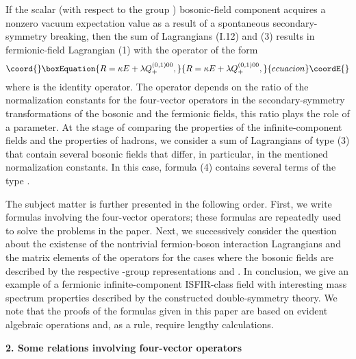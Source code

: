 \documentclass[a4paper,12pt]{article}
\begin{document}
If the scalar (with respect to the group \coordHE{}) bosonic-field 
component \coordHE{} acquires a nonzero vacuum expectation
value \myHighlight{$\lambda$}\coordHE{} as a result of a spontaneous secondary-symmetry breaking, then
the sum of Lagrangians (I.12) and (3) results in fermionic-field Lagrangian (1)
with the operator \coordHE{} of the form
\begin{equation}\coord{}\boxEquation{
R = \kappa E + \lambda Q^{(0,1)00}_{+},
}{
R = \kappa E + \lambda Q^{(0,1)00}_{+},
}{ecuacion}\coordE{}\end{equation}
where \coordHE{} is the identity operator. The operator \coordHE{} depends on
the ratio of the normalization constants for the four-vector operators 
\coordHE{} in the secondary-symmetry transformations of the bosonic and the
fermionic fields, this ratio plays the role of a parameter. At the stage of
comparing the properties of the infinite-component fields and the properties of
hadrons, we consider a sum of Lagrangians of type (3) that contain several 
bosonic fields that differ, in particular, in the mentioned normalization 
constants. In this case, formula (4) contains several terms of the type 
\coordHE{}. 

The subject matter is further presented in the following order. First, we write
formulas involving the four-vector operators; these formulas are repeatedly 
used to solve the problems in the paper. Next, we successively consider the 
question about the existense of the nontrivial fermion-boson interaction 
Lagrangians and the matrix elements of the operators \coordHE{} for 
the cases where the bosonic fields are described by the respective 
\coordHE{}-group representations \coordHE{} and \coordHE{}. In conclusion, 
we give an example of a fermionic infinite-component ISFIR-class field with
interesting mass spectrum properties described by the constructed
double-symmetry theory. We note that the proofs of the formulas given in this
paper are based on evident algebraic operations and, as a rule, require lengthy
calculations.

\begin{center}
{\large \bf 2. Some relations involving four-vector operators}
\end{center}
\end{document}

